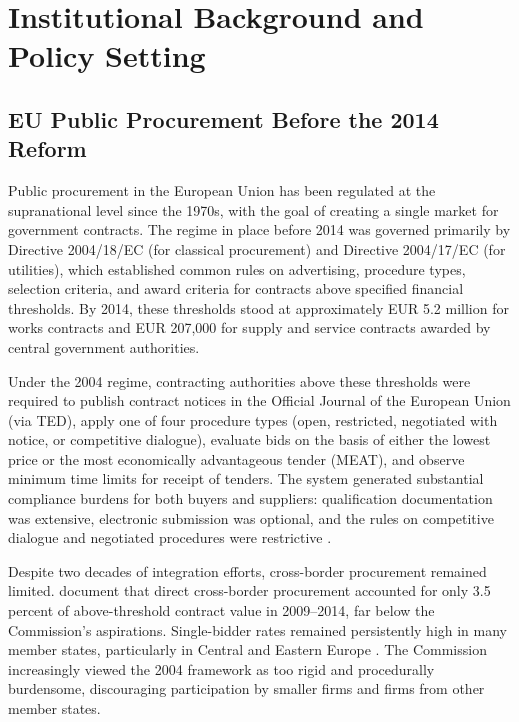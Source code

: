 \documentclass[12pt]{article}
\begin{document}
\section{Institutional Background and Policy Setting}
\label{sec:background}

\subsection{EU Public Procurement Before the 2014 Reform}

Public procurement in the European Union has been regulated at the supranational level since the 1970s, with the goal of creating a single market for government contracts. The regime in place before 2014 was governed primarily by Directive 2004/18/EC (for classical procurement) and Directive 2004/17/EC (for utilities), which established common rules on advertising, procedure types, selection criteria, and award criteria for contracts above specified financial thresholds. By 2014, these thresholds stood at approximately EUR 5.2 million for works contracts and EUR 207,000 for supply and service contracts awarded by central government authorities.

Under the 2004 regime, contracting authorities above these thresholds were required to publish contract notices in the Official Journal of the European Union (via TED), apply one of four procedure types (open, restricted, negotiated with notice, or competitive dialogue), evaluate bids on the basis of either the lowest price or the most economically advantageous tender (MEAT), and observe minimum time limits for receipt of tenders. The system generated substantial compliance burdens for both buyers and suppliers: qualification documentation was extensive, electronic submission was optional, and the rules on competitive dialogue and negotiated procedures were restrictive \citep{trybus2014}.

Despite two decades of integration efforts, cross-border procurement remained limited. \citet{kutlinaDimitrovaLakatos2016} document that direct cross-border procurement accounted for only 3.5 percent of above-threshold contract value in 2009--2014, far below the Commission's aspirations. Single-bidder rates remained persistently high in many member states, particularly in Central and Eastern Europe \citep{fazekasKocsis2020, fazekasToth2016}. The Commission increasingly viewed the 2004 framework as too rigid and procedurally burdensome, discouraging participation by smaller firms and firms from other member states.
\end{document}
